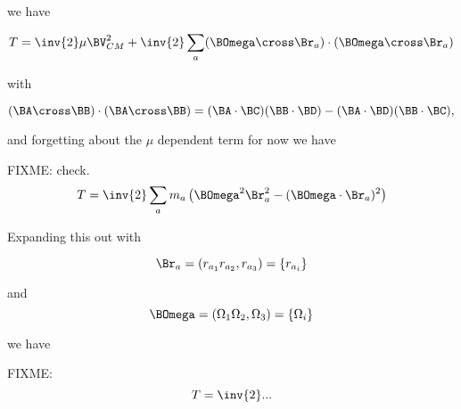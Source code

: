 we have

\begin{equation}\label{eqn:rigidBodyMotion:400}
T = \inv{2} \mu \BV_{CM}^2+ \inv{2} \sum_a 
(\BOmega \cross \Br_a) \cdot (\BOmega \cross \Br_a) 
\end{equation}

with

\begin{equation}\label{eqn:rigidBodyMotion:420}
(\BA \cross \BB) \cdot (\BA \cross \BB)
=
(\BA \cdot \BC) (\BB \cdot \BD)
-(\BA \cdot \BD) (\BB \cdot \BC),
\end{equation}

and forgetting about the $\mu$ dependent term for now we have

FIXME: check.
\begin{equation}\label{eqn:rigidBodyMotion:440}
T = \inv{2} \sum_a m_a \left( \BOmega^2 \Br_a^2 - (\BOmega \cdot \Br_a)^2
\right)
\end{equation}

Expanding this out with 

\begin{equation}\label{eqn:rigidBodyMotion:460}
\Br_a = ( r_{a_1} r_{a_2}, r_{a_3} ) = \{ r_{a_i} \}
\end{equation}

and 
\begin{equation}\label{eqn:rigidBodyMotion:480}
\BOmega = ( \Omega_{1} \Omega_{2}, \Omega_{3} ) = \{ \Omega_{i} \}
\end{equation}

we have

FIXME:
\begin{equation}\label{eqn:rigidBodyMotion:500}
T = \inv{2} ...
\end{equation}

\EndNoBibArticle

